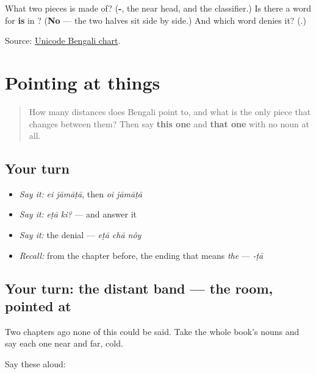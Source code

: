 \begin{tcolorbox}[breakable,colback=teal!4,colframe=teal!35!black,title={Before you move on}]
What two pieces is \textbf{} made of? (\textbf{-}, the near head, and the classifier.) Is there a word for \textbf{is} in \textbf{ }? (\textbf{No} — the two halves sit side by side.) And which word denies it? (\textbf{}.)

Source: \href{https://www.unicode.org/charts/PDF/U0980.pdf}{Unicode Bengali chart}.
\end{tcolorbox}
\section[\texorpdfstring{\bn{এই} · \bn{ওই} · \bn{এটা} (ei · oi · eṭā)}{এই · ওই · এটা (ei · oi · eṭā)}]{Pointing at things}

\label{lesson:BN-R21-pointing}



\begin{quote}
How many distances does Bengali point to, and what is the only piece that changes between them? Then say \textbf{this one} and \textbf{that one} with no noun at all.
\end{quote}

\subsection*{Your turn}
\begin{itemize}
\raggedright
  \item \emph{Say it:} \emph{ei jāmāṭā}, then \emph{oi jāmāṭā}
  \item \emph{Say it:} \emph{eṭā ki?} — and answer it
  \item \emph{Say it:} the denial — \emph{eṭā chā nôy}
  \item \emph{Recall:} from the chapter before, the ending that means \emph{the} — \emph{-ṭā}
\end{itemize}

\subsection*{Your turn: the distant band — the room, pointed at}
Two chapters ago none of this could be said. Take the whole book's nouns and say each one near and far, cold.

Say these aloud:

